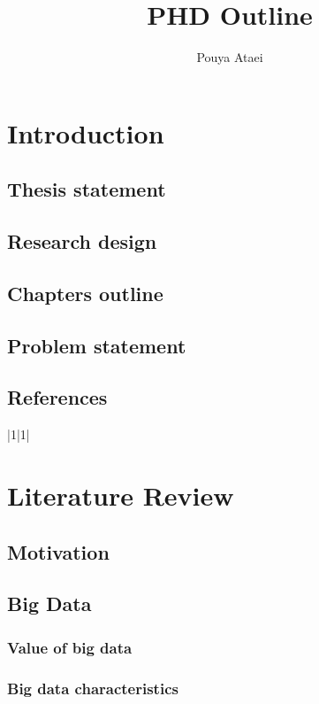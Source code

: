 \documentclass{article}
\title{PHD Outline}
\author{Pouya Ataei}
\begin{document}
\maketitle

\section{Introduction}
\subsection{Thesis statement}
\subsection{Research design}
\subsection{Chapters outline}
\subsection{Problem statement}
\hspace{1cm}

\subsection{References}
\begin{tabular}{|1|1|}
\end{tabular}
\hspace{1cm}

\section{Literature Review}
\subsection{Motivation}
\hspace{0.2cm}

\subsection{Big Data}
\subsubsection{Value of big data}
\subsubsection{Big data characteristics}
\end{document}

